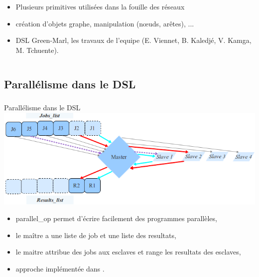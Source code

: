 \documentclass[10pt]{beamer}
\begin{document}
\begin{frame}
\begin{columns}[T]
\begin{column}{.48\textwidth}
\begin{block}{}
\begin{itemize}
      \end{itemize}
    \end{block}
      \begin{itemize}
       \item Plusieurs primitives utilisées dans la fouille des réseaux
       \item création d'objets graphe, manipulation (n\oe uds, arêtes), ...
       \item DSL Green-Marl, les travaux de l'equipe (E. Viennet, B. Kaledjé, V. Kamga, M. Tchuente).
      \end{itemize}
    \end{column}
  \end{columns}
\end{frame}
\subsection{Parallélisme dans le DSL}
\begin{frame}
\frametitle{}
\begin{block}{Parallélisme dans le DSL}
 \includegraphics[scale=0.46]{images/dsl_parallelism.png}
\end{block}
\begin{block}{}
 \begin{itemize}
  \item parallel\_op permet d'écrire facilement des programmes parallèles,
  \item le maître a une liste de job et une liste des resultats,
  \item le maitre attribue des jobs aux esclaves et range les resultats des esclaves,
  \item approche implémentée dans \cite{articledisnet}.
 \end{itemize}

\end{block}
\end{frame}
\end{document}
